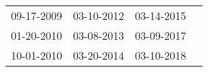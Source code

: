 \begin{supertabular}{llll}
 09-17-2009 &  03-10-2012 &  03-14-2015 \\
 01-20-2010 &  03-08-2013 &  03-09-2017 \\
 10-01-2010 &  03-20-2014 &  03-10-2018 \\
\end{supertabular}
